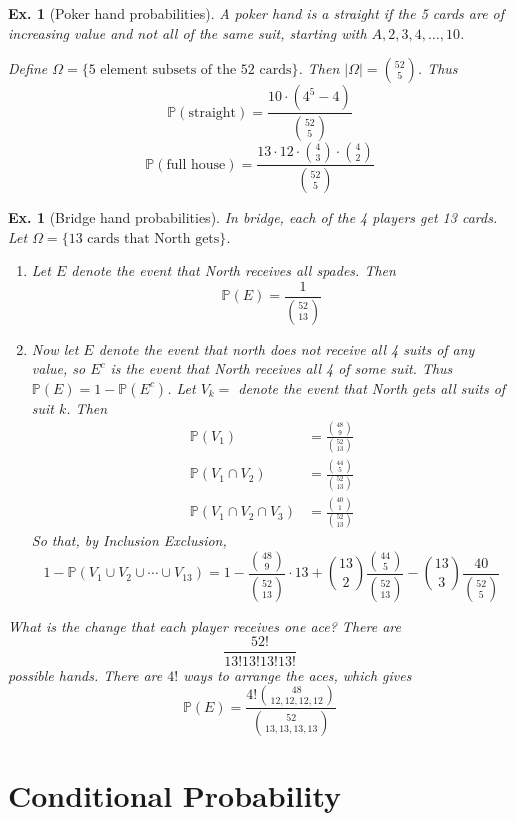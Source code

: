 \documentclass[12pt, a4paper]{book}
\renewcommand{\Pr}{\mathbb{P}}
\newtheorem{example}[theorem]{Ex.}
\theoremstyle{nonumberplain}
\begin{document}
\begin{example}[Poker hand probabilities]
    A poker hand is a straight if the 5 cards are of increasing value and not all of the same suit, starting with $A,2,3,4,\ldots,10$.

    Define $\Omega=\{\text{5 element subsets of the 52 cards}\}$.
    Then $|\Omega|=\binom{52}{5}$.
    Thus
    \[\Pr(\text{straight})=\frac{10\cdot (4^5-4)}{\binom{52}{5}}\]
    \[\Pr(\text{full house})=\frac{13\cdot 12\cdot\binom{4}{3}\cdot\binom{4}{2}}{\binom{52}{5}}\]
\end{example}
\begin{example}[Bridge hand probabilities]
    In bridge, each of the 4 players get 13 cards.
    Let $\Omega=\{\text{13 cards that North gets}\}$.
    \begin{enumerate}
        \item Let $E$ denote the event that North receives all spades.
            Then
            \[\Pr(E)=\frac{1}{\binom{52}{13}}\]
        \item Now let $E$ denote the event that north does not receive all 4 suits of any value, so $E^c$ is the event that North receives all 4 of some suit.
            Thus $\Pr(E)=1-\Pr(E^c)$.
            Let $V_k=$ denote the event that North gets all suits of suit $k$.
            Then
            \begin{align*}
                \Pr(V_1) &= \frac{\binom{48}{9}}{\binom{52}{13}}\\
                \Pr(V_1\cap V_2) &= \frac{\binom{44}{5}}{\binom{52}{13}}\\
                \Pr(V_1\cap V_2\cap V_3) &= \frac{\binom{40}{1}}{\binom{52}{13}}
            \end{align*}
            So that, by Inclusion Exclusion,
            \[1-\Pr(V_1\cup V_2\cup\cdots\cup V_{13})=1-\frac{\binom{48}{9}}{\binom{52}{13}}\cdot 13+\binom{13}{2}\frac{\binom{44}{5}}{\binom{52}{13}}-\binom{13}{3}\frac{40}{\binom{52}{5}}\]
    \end{enumerate}
    What is the change that each player receives one ace?
    There are
    \[\frac{52!}{13!13!13!13!}\]
    possible hands.
    There are $4!$ ways to arrange the aces, which gives
    \[\Pr(E)=\frac{4!\binom{48}{12,12,12,12}}{\binom{52}{13,13,13,13}}\]
\end{example}
\section{Conditional Probability}
\end{document}
